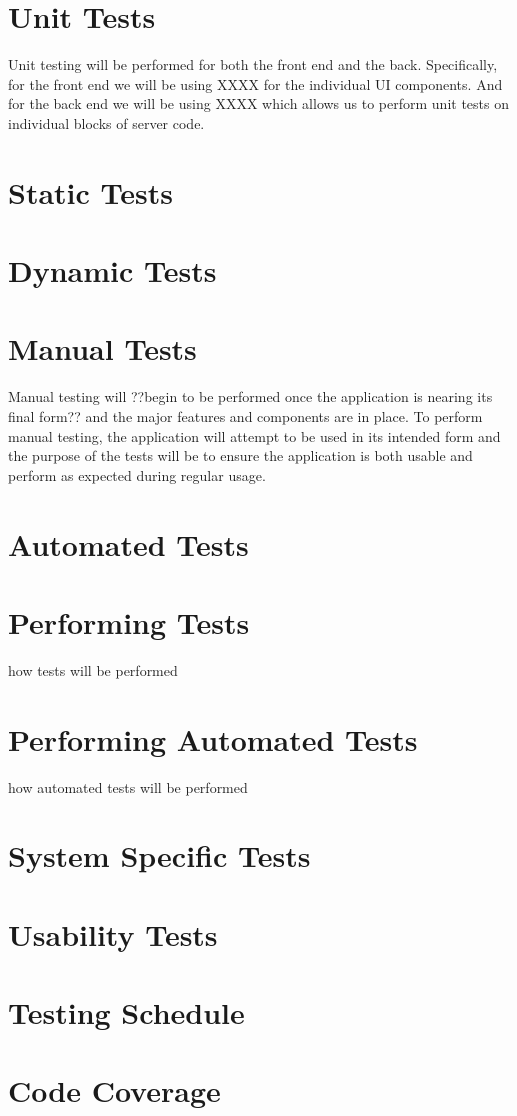 \documentclass{article}
\begin{document}
\section{Unit Tests}
Unit testing will be performed for both the front end and the back.
Specifically, for the front end we will be using XXXX for the individual UI
components. And for the back end we will be using XXXX which allows us to
perform unit tests on individual blocks of server code.

\section{Static Tests}

\section{Dynamic Tests}

\section{Manual Tests}
Manual testing will ??begin to be performed once the application is nearing its
final form?? and the major features and components are in place. To perform
manual testing, the application will attempt to be used in its intended form
and the purpose of the tests will be to ensure the application is both usable
and perform as expected during regular usage.

\section{Automated Tests}

\section{Performing Tests}
how tests will be performed

\section{Performing Automated Tests}
how automated tests will be performed

\section{System Specific Tests}

\section{Usability Tests}

\section{Testing Schedule}

\section{Code Coverage}
\end{document}
